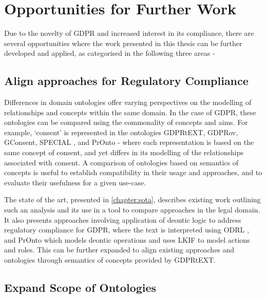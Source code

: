 \section{Opportunities for Further Work}\label{sec:conclusion-future-work}
Due to the novelty of GDPR and increased interest in its compliance, there are several opportunities where the work presented in this thesis can be further developed and applied, as categorised in the following three areas -
\subsection*{Align approaches for Regulatory Compliance}
Differences in domain ontologies offer varying perspectives on the modelling of relationships and concepts within the same domain. In the case of GDPR, these ontologies can be compared using the commonality of concepts and aims. For example, `consent' is represented in the ontologies GDPRtEXT, GDPRov, GConsent, SPECIAL \cite{kirrane_scalable_2018}, and PrOnto \cite{palmirani_pronto:_2018} - where each representation is based on the same concept of consent, and yet differs in its modelling of the relationships associated with consent. A comparison of ontologies based on semantics of concepts is useful to establish compatibility in their usage and approaches, and to evaluate their usefulness for a given use-case.

The state of the art, presented in \autoref{chapter:sota}, describes existing work outlining such an analysis \cite{leone_taking_2019} and its use in a tool \cite{leone_legal_2018} to compare approaches in the legal domain. It also presents approaches involving application of deontic logic to address regulatory compliance for GDPR, where the text is interpreted using ODRL \cite{agarwal_modelling_2017}, and  PrOnto \cite{palmirani_pronto:_2018} which models deontic operations and uses LKIF \cite{hoekstra_lkif_2007} to model actions and roles.
This can be further expanded to align existing approaches and ontologies through semantics of concepts provided by GDPRtEXT.

\subsection*{Expand Scope of Ontologies}
